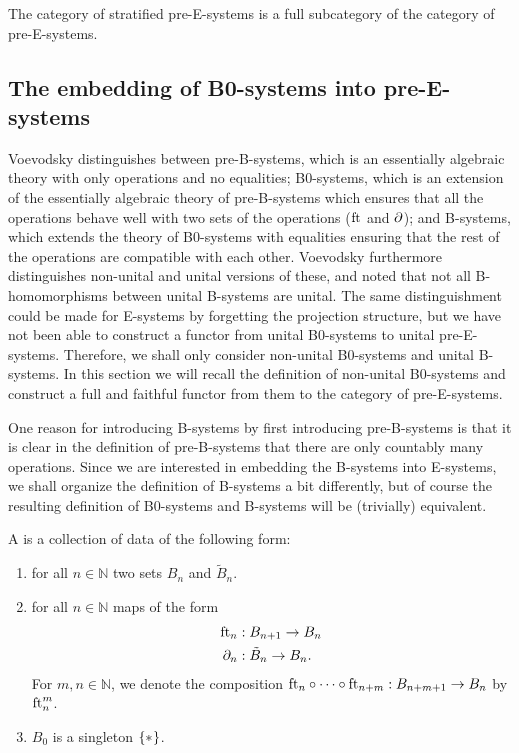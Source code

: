 \begin{cor}\label{lem:strat_full}
The category of stratified pre-E-systems is a full subcategory of the category of
pre-E-systems.
\end{cor}

\subsection{The embedding of B0-systems into pre-E-systems}

Voevodsky distinguishes between pre-B-systems, which is an essentially algebraic theory with
only operations and no equalities; B0-systems, which is an extension of the
essentially algebraic theory of pre-B-systems which ensures that all the operations behave
well with two sets of the operations ($\eft$ and $\ebd$); and B-systems, which extends the 
theory of B0-systems with equalities ensuring that the rest of the operations 
are compatible with each other. 
Voevodsky furthermore distinguishes
non-unital and unital versions of these, and noted that not all B-homomorphisms
between unital B-systems are unital. The same distinguishment could be made for 
E-systems by forgetting the projection structure, but we have not been able to construct a
functor from unital B0-systems to unital pre-E-systems. Therefore, we shall only
consider non-unital B0-systems and unital B-systems. In this section we will
recall the definition of non-unital B0-systems and construct a full and faithful
functor from them to the category of pre-E-systems. 

One reason for introducing B-systems by first introducing pre-B-systems is that
it is clear in the definition of pre-B-systems that there are only countably
many operations. Since we are interested in embedding the B-systems into E-systems,
we shall organize the definition of B-systems a bit differently, but of course
the resulting definition of B0-systems and B-systems will be (trivially) 
equivalent.

\begin{defn}
A  is a collection of data of the following form:
\begin{enumerate}
\item for all $n\in\mathbb{N}$ two sets $B_n$ and $\tilde{B}_n$. 
\item for all $n\in\mathbb{N}$ maps of the form
\begin{align*}
\eft[n] & : B_{n+1}\to B_n \\
\ebd[n] & : \tilde{B}_n\to B_n.
\end{align*}
For $m,n\in\mathbb{N}$, we denote the composition $\eft[n]\circ\cdots\circ\eft[n+m]:B_{n+m+1}\to B_n$ by $\eft[n]^m$. 
\item $B_0$ is a singleton $\{\pt\}$.
\end{enumerate} 
\end{defn}

